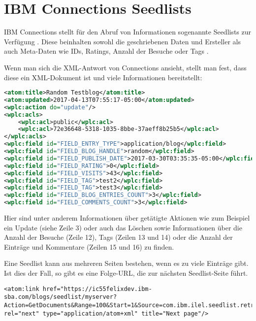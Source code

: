 \section{IBM Connections Seedlists}
IBM Connections stellt für den Abruf von Informationen sogenannte Seedlists zur Verfügung \cite{conn2}. Diese beinhalten sowohl die geschriebenen Daten und Ersteller als auch Meta-Daten wie IDs, Ratings, Anzahl der Besuche oder Tags \cite{resp}. 

Wenn man sich die XML-Antwort von Connections ansieht, stellt man fest, dass diese ein XML-Dokument ist und viele Informationen bereitstellt: \\

\noindent
\begin{minipage}{\linewidth}
\begin{lstlisting}[title=Auszug aus einer XML-Antwort von der Connections Blogs-Applikation, language=XML]
<atom:title>Random Testblog</atom:title>
<atom:updated>2017-04-13T07:55:17-05:00</atom:updated>
<wplc:action do="update"/>
<wplc:acls>
	<wplc:acl>public</wplc:acl>
	<wplc:acl>72e36648-5318-1035-8bbe-37aeff8b25b5</wplc:acl>
</wplc:acls>
<wplc:field id="FIELD_ENTRY_TYPE">application/blog</wplc:field>
<wplc:field id="FIELD_BLOG_HANDLE">random</wplc:field>
<wplc:field id="FIELD_PUBLISH_DATE">2017-03-30T03:35:35-05:00</wplc:field>
<wplc:field id="FIELD_RATING">0</wplc:field>
<wplc:field id="FIELD_VISITS">43</wplc:field>
<wplc:field id="FIELD_TAG">test2</wplc:field>
<wplc:field id="FIELD_TAG">test3</wplc:field>
<wplc:field id="FIELD_BLOG_ENTRIES_COUNT">3</wplc:field>
<wplc:field id="FIELD_COMMENTS_COUNT">3</wplc:field>
\end{lstlisting}
\end{minipage}

Hier sind unter anderem Informationen über getätigte Aktionen wie zum Beispiel ein Update (siehe Zeile 3) oder auch das Löschen sowie Informationen über die Anzahl der Besuche (Zeile 12), Tags (Zeilen 13 und 14) oder die Anzahl der Einträge und Kommentare (Zeilen 15 und 16) zu finden.

Eine Seedlist kann aus mehreren Seiten bestehen, wenn es zu viele Einträge gibt. Ist dies der Fall, so gibt es eine Folge-URL, die zur nächsten Seedlist-Seite führt. \\
\begin{lstlisting}[title=Darstellung der Folge-URL in der Seedlist]
<atom:link href="https://ic55felixdev.ibm-sba.com/blogs/seedlist/myserver?Action=GetDocuments&Range=100&Start=1&Source=com.ibm.ilel.seedlist.retriever.connections.blogs.BlogsRetrieverFactory&Format=atom&Locale=en_US&State=MTsxNDk3ODcyMDE0Mjg5OzA7MTUwMzMxODA1MzU1Mjt0cnVlOzA7MA%3D%3D" rel="next" type="application/atom+xml" title="Next page"/>
\end{lstlisting}

